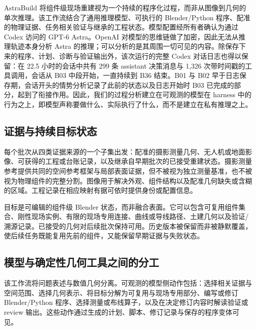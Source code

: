 \documentclass[10pt,a4paper]{article}
\begin{document}
AstraBuild
将组件级现场重建视为一个持续的程序化过程，而非从图像到几何的单次推理。该工作流结合了通用推理模型、可执行的
Blender/Python
程序、配准的物理证据、任务相关验证与继承的工程状态。模型配置经所有者确认为通过
Codex 访问的 GPT-6 Astra。OpenAI
对模型的思维链做了加密，因此无法从推理轨迹本身分析 Astra
的推理；可以分析的是其周围一切可见的内容。除保存下来的程序、计划、诊断与验证输出外，该次运行的完整
Codex 对话日志也得以保留：在 22.5 小时的会话中共有 299 条 assistant
决策消息与 1,326 次带时间戳的工具调用，会话从 B03 中段开始，一直持续到
B36 结束。B01 与 B02
早于日志保存期，会话开头的情势分析记录了此前的状态以及日志开始时 B03
已完成的部分，起到了衔接作用。因此，我们的过程分析建立在可观测的模型在
harness
中的行为之上，即模型声称要做什么、实际执行了什么，而不是建立在私有推理之上。

\hypertarget{ux8bc1ux636eux4e0eux6301ux7eedux76eeux6807ux72b6ux6001}{%
\subsection{证据与持续目标状态}\label{ux8bc1ux636eux4e0eux6301ux7eedux76eeux6807ux72b6ux6001}}

每个批次从四类证据来源的一个子集出发：配准的摄影测量几何、无人机或地面影像、可获得的工程或台账记录，以及继承自早期批次的已接受重建状态。摄影测量参考提供共同的空间参考框架与局部表面证据，但不被视为独立测量基准，也不被视为物理组件的完整分割。图像用于解决外观、组件结构以及配准几何缺失或含糊的区域。工程记录在相应映射有据可依时提供身份或配置信息。

目标是可编辑的组件级 Blender
状态，而非融合表面。它可以包含可复用组件集合、刚性现场实例、有限的现场专用连接、曲线或导线路径、土建几何以及验证/溯源记录。已接受的几何对后续批次保持可用。历史版本被保留而非被静默覆盖，使后续任务既能复用先前的组件，又能保留早期证据与失败状态。

\hypertarget{ux6a21ux578bux4e0eux786eux5b9aux6027ux51e0ux4f55ux5de5ux5177ux4e4bux95f4ux7684ux5206ux5de5}{%
\subsection{模型与确定性几何工具之间的分工}\label{ux6a21ux578bux4e0eux786eux5b9aux6027ux51e0ux4f55ux5de5ux5177ux4e4bux95f4ux7684ux5206ux5de5}}

该工作流将问题表述与数值几何分离。可观测的模型侧动作包括：选择相关证据与空间范围、选择几何表示、将目标分解为可复用与现场专用部分、编写或修订
Blender/Python 程序、选择测量或布线算子，以及在决定修订内容时解读验证或
review
输出。这些动作通过生成的计划、脚本、修订记录与保存的程序变体可见。
\end{document}
